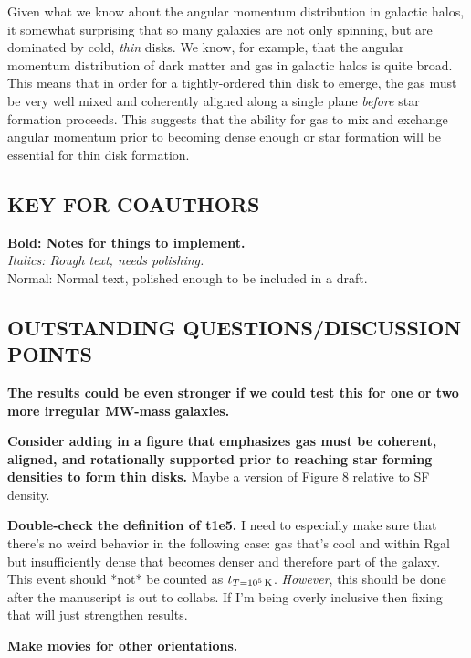 \documentclass[fleqn,usenatbib]{mnras}
\newcommand{\tcon}{t_{T=10^5\,{\rm K}}}
\begin{document}
Given what we know about the angular momentum distribution in galactic halos, it somewhat surprising that so many galaxies are not only spinning, but are dominated by cold, {\em thin} disks.    We know, for example, that the angular momentum distribution of dark matter \citep{B01} and gas \citep{Stewart13,DeFelippis2020} in galactic halos is quite broad.  This means that in order for a tightly-ordered thin disk to emerge, the gas must be very well mixed and  coherently aligned along a single plane {\em before} star formation proceeds.  This suggests that the ability for gas to mix and exchange angular momentum prior to becoming dense enough or star formation will be essential for thin disk formation. 
 




\subsection{KEY FOR COAUTHORS}
\textbf{Bold: Notes for things to implement.} \\
\textit{Italics: Rough text, needs polishing.} \\
Normal: Normal text, polished enough to be included in a draft.

\subsection{OUTSTANDING QUESTIONS/DISCUSSION POINTS}

\textbf{The results could be even stronger if we could test this for one or two more irregular MW-mass galaxies.}

\textbf{Consider adding in a figure that emphasizes gas must be coherent, aligned, and rotationally supported prior to reaching star forming densities to form thin disks.}
Maybe a version of Figure 8 relative to SF density.

\textbf{Double-check the definition of t1e5.}
I need to especially make sure that there's no weird behavior in the following case:
gas that's cool and within Rgal but insufficiently dense that becomes denser and therefore part of the galaxy.
This event should *not* be counted as $\tcon$.
\textit{However}, this should be done after the manuscript is out to collabs.
If I'm being overly inclusive then fixing that will just strengthen results.

\textbf{Make movies for other orientations.}
\end{document}
